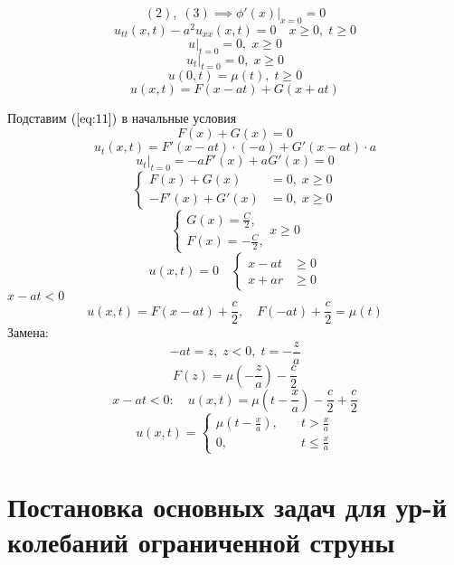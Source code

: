 \documentclass[a4paper]{article}
\begin{document}
\[
    (2), \; (3) \implies \phi'(x) |_{x=0} = 0
\]
\begin{equation}
    u_{t t}(x,t) - a^2 u_{xx}(x,t) = 0 \quad x \geq 0, \; t \geq 0
\end{equation}
\begin{equation}
    u|_{t=0} = 0, \; x \geq 0
\end{equation}
\begin{equation}
    u_t|_{t=0} = 0, \; x \geq 0
\end{equation}
\begin{equation}
    u(0,t) = \mu(t), \; t \geq 0
\end{equation}
\begin{equation}
    u(x,t) = F(x-at) + G(x+at)
    \label{eq:11}
\end{equation}

Подставим $ (\ref{eq:11}) $ в начальные условия
\[
    F(x) + G(x) = 0
\]
\[
    u_t(x,t) = F'(x-at)\cdot (-a) + G'(x-at)\cdot a
\]
\[
    u_t |_{t=0} = -aF'(x) + aG'(x) = 0
\]
\[
    \begin{cases}
        F(x) + G(x) &= 0, \; x \geq 0\\
        -F'(x) + G'(x) &= 0, \; x \geq 0
    \end{cases}
\]
\[
    \begin{cases}
        G(x) = \frac{C}{2}, \\
        F(x) = - \frac{C}{2}, 
    \end{cases}
    x \geq 0
\]
\[
    u(x,t) = 0 \quad
    \begin{cases}
        x - at &\geq 0\\
        x + ar &\geq 0
    \end{cases}
\]
$ x - at < 0 $ 
\[
    u(x,t) = F(x -at) + \frac{c}{2}, \quad F(-at) + \frac{c}{2} = \mu(t)
\]
Замена:
\[
    -at = z, \; z < 0, \; t = -\frac{z}{a} 
\]
\[
    F(z) = \mu(-\frac{z}{a}) - \frac{c}{2} 
\]
\[
    x - at < 0: \quad u(x,t) = \mu(t - \frac{x}{a}) - \frac{c}{2} + \frac{c}{2} 
\]
\[
    u(x,t) = 
    \begin{cases}
        \mu(t - \frac{x}{a}), &\quad t > \frac{x}{a} \\
        0, &\quad t \leq \frac{x}{a} 
    \end{cases}
\]

\section*{\centering Постановка основных задач для ур-й колебаний ограниченной
струны}
\end{document}
